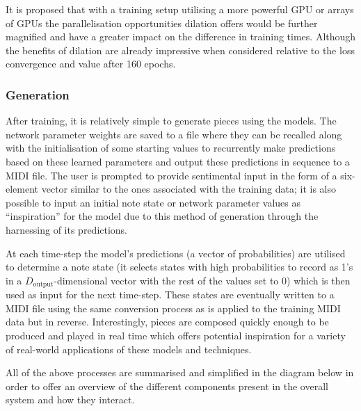 \documentclass[12pt,]{article}
\begin{document}
It is proposed that with a training setup utilising a more powerful GPU
or arrays of GPUs the parallelisation opportunities dilation offers
would be further magnified and have a greater impact on the difference
in training times. Although the benefits of dilation are already
impressive when considered relative to the loss convergence and value
after 160 epochs.

\hypertarget{generation}{%
\subsubsection{Generation}\label{generation}}

After training, it is relatively simple to generate pieces using the
models. The network parameter weights are saved to a file where they can
be recalled along with the initialisation of some starting values to
recurrently make predictions based on these learned parameters and
output these predictions in sequence to a MIDI file. The user is
prompted to provide sentimental input in the form of a six-element
vector similar to the ones associated with the training data; it is also
possible to input an initial note state or network parameter values as
``inspiration'' for the model due to this method of generation through
the harnessing of its predictions.

At each time-step the model's predictions (a vector of probabilities)
are utilised to determine a note state (it selects states with high
probabilities to record as 1's in a \(D_{\text{output}}\)-dimensional
vector with the rest of the values set to 0) which is then used as input
for the next time-step. These states are eventually written to a MIDI
file using the same conversion process as is applied to the training
MIDI data but in reverse. Interestingly, pieces are composed quickly
enough to be produced and played in real time which offers potential
inspiration for a variety of real-world applications of these models and
techniques.

All of the above processes are summarised and simplified in the diagram
below in order to offer an overview of the different components present
in the overall system and how they interact.
\end{document}
